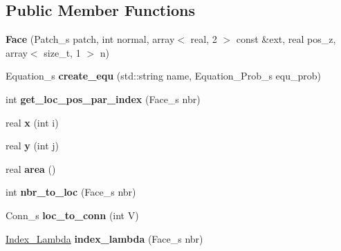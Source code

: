 \subsection*{Public Member Functions}
\begin{DoxyCompactItemize}
\item 
\hypertarget{classFace_a66d5955aa6386be0fd482a5ac1174229}{
{\bfseries Face} (Patch\_\-s patch, int normal, array$<$ real, 2 $>$ const \&ext, real pos\_\-z, array$<$ size\_\-t, 1 $>$ n)}
\label{classFace_a66d5955aa6386be0fd482a5ac1174229}

\item 
\hypertarget{classFace_a5e444cef6d1f3fb3b7d64a4799f59eb9}{
Equation\_\-s {\bfseries create\_\-equ} (std::string name, Equation\_\-Prob\_\-s equ\_\-prob)}
\label{classFace_a5e444cef6d1f3fb3b7d64a4799f59eb9}

\item 
\hypertarget{classFace_a7ebc4163752a05d82e184a3a4c8671b3}{
int {\bfseries get\_\-loc\_\-pos\_\-par\_\-index} (Face\_\-s nbr)}
\label{classFace_a7ebc4163752a05d82e184a3a4c8671b3}

\item 
\hypertarget{classFace_aed5980668f26bc29338dfa11b32919f5}{
real {\bfseries x} (int i)}
\label{classFace_aed5980668f26bc29338dfa11b32919f5}

\item 
\hypertarget{classFace_a9a4d892bf5e8782c898e15aa5a989806}{
real {\bfseries y} (int j)}
\label{classFace_a9a4d892bf5e8782c898e15aa5a989806}

\item 
\hypertarget{classFace_a2d20ebd0d99063967bb26657abebbcbe}{
real {\bfseries area} ()}
\label{classFace_a2d20ebd0d99063967bb26657abebbcbe}

\item 
\hypertarget{classFace_a06eb55371bc742e523a9eb94a573209d}{
int {\bfseries nbr\_\-to\_\-loc} (Face\_\-s nbr)}
\label{classFace_a06eb55371bc742e523a9eb94a573209d}

\item 
\hypertarget{classFace_a60baec409a104a88e6622efa2f80122c}{
Conn\_\-s {\bfseries loc\_\-to\_\-conn} (int V)}
\label{classFace_a60baec409a104a88e6622efa2f80122c}

\item 
\hypertarget{classFace_a9a5eb93863dc767848261afa813ca039}{
\hyperlink{structIndex__Lambda}{Index\_\-Lambda} {\bfseries index\_\-lambda} (Face\_\-s nbr)}
\label{classFace_a9a5eb93863dc767848261afa813ca039}


\end{DoxyCompactItemize}
